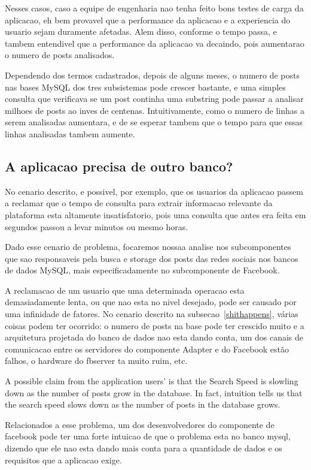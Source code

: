 Nesses casos, caso a equipe de engenharia nao tenha feito bons testes de carga da aplicacao, eh bem provavel que a performance da aplicacao e a experiencia do usuario sejam duramente afetadas. Alem disso, conforme o tempo passa, e tambem entendivel que a performance da aplicacao va decaindo, pois aumentarao o numero de posts analisados. 

Dependendo dos termos cadastrados, depois de alguns meses, o numero de posts nas bases MySQL dos tres subsistemas pode crescer bastante, e uma simples consulta que verificava se um post continha uma substring pode passar a analisar milhoes de posts ao inves de centenas. Intuitivamente, como o numero de linhas a serem analisadas aumentara, e de se esperar tambem que o tempo para que essas linhas analisadas tambem aumente. 

\subsection{A aplicacao precisa de outro banco?}
\label{anotherdb}
No cenario descrito, e possivel, por exemplo, que os usuarios da aplicacao passem a reclamar que o tempo de consulta para extrair informacao relevante da plataforma esta altamente insatisfatorio, pois uma consulta que antes era feita em segundos passou a levar minutos ou mesmo horas.

Dado esse cenario de problema, focaremos nossaa analise nos subcomponentes que sao responsaveis pela busca e storage dos posts das redes sociais nos bancos de dados MySQL, mais especificadamente no subcomponente de Facebook. 

A reclamacao de um usuario que uma determinada operacao esta demasiadamente lenta, ou que nao esta no nivel desejado, pode ser causado por uma infinidade de fatores. No cenario descrito na subsecao~\ref{shithappens}, várias coisas podem ter ocorrido: o numero de posts na base pode ter crescido muito e a arquitetura projetada do banco de dados nao esta dando conta, um dos canais de comunicacao entre os servidores do componente Adapter e do Facebook estão falhos, o hardware do fbserver ta muito ruim, etc.

A possible claim from the application users' is that the Search Speed is slowling down as the number of posts grow in the database. In fact, intuition tells us that the search speed slows down as the number of posts in the database grows. 

Relacionados a esse problema, um dos desenvolvedores do componente de facebook pode ter uma forte intuicao de que o problema esta no banco mysql, dizendo que ele nao esta dando mais conta para a quantidade de dados e os requisitos que a aplicacao exige. 

